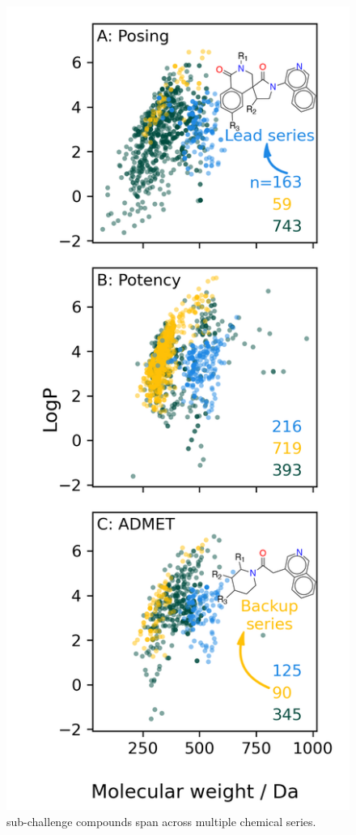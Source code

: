 \documentclass[journal=jcim,manuscript=article]{achemso}
\begin{document}
\begin{figure}
    \includegraphics[scale=0.9]{03_figs_data_preparation/subchallenge_physprops_with_scaffolds.png}
  \caption{sub-challenge compounds span across multiple chemical series. }
  \label{fgr:physprops_scaffolds}
\end{figure}
\end{document}
